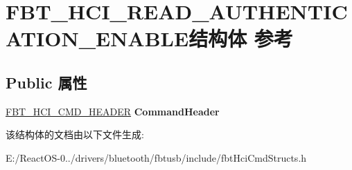 \hypertarget{struct_f_b_t___h_c_i___r_e_a_d___a_u_t_h_e_n_t_i_c_a_t_i_o_n___e_n_a_b_l_e}{}\section{F\+B\+T\+\_\+\+H\+C\+I\+\_\+\+R\+E\+A\+D\+\_\+\+A\+U\+T\+H\+E\+N\+T\+I\+C\+A\+T\+I\+O\+N\+\_\+\+E\+N\+A\+B\+L\+E结构体 参考}
\label{struct_f_b_t___h_c_i___r_e_a_d___a_u_t_h_e_n_t_i_c_a_t_i_o_n___e_n_a_b_l_e}
\subsection*{Public 属性}
\begin{DoxyCompactItemize}
\item 
\mbox{\label{struct_f_b_t___h_c_i___r_e_a_d___a_u_t_h_e_n_t_i_c_a_t_i_o_n___e_n_a_b_l_e_ae2bfa51bd09d6bba49d0c56b8352343f}} 
\hyperlink{struct_f_b_t___h_c_i___c_m_d___h_e_a_d_e_r}{F\+B\+T\+\_\+\+H\+C\+I\+\_\+\+C\+M\+D\+\_\+\+H\+E\+A\+D\+ER} {\bfseries Command\+Header}
\end{DoxyCompactItemize}


该结构体的文档由以下文件生成\+:\begin{DoxyCompactItemize}
\item 
E\+:/\+React\+O\+S-\/0../drivers/bluetooth/fbtusb/include/fbt\+Hci\+Cmd\+Structs.\+h\end{DoxyCompactItemize}
